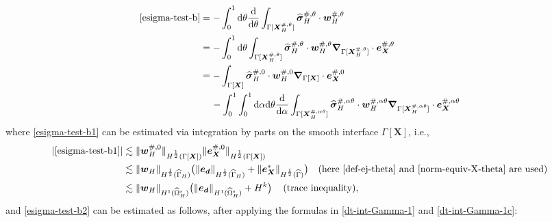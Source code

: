 \documentclass[11pt,reqno]{amsart}
\theoremstyle{definition}
\theoremstyle{plain}
\numberwithin{theorem}{section}
\numberwithin{proposition}{section}
\numberwithin{lemma}{section}
\numberwithin{equation}{section}
\newcommand{\bs}[1]{\boldsymbol{#1}}
\newcommand{\uu}[1]  {{\bs{#1}} }
\newcommand{\grad}   { \uu{\nabla}    }
\def\d{\mathrm{d}}
\newcommand{\bw}{{\bs w}}
\renewcommand{\(}{\bigl(}
\renewcommand{\)}{\bigr)}
\begin{document}
\begin{subequations}\label{esigma-test-b12}
\begin{align}
\eqref{esigma-test-b}
&= - \int_0^1\d\theta\frac{\d}{\d\theta}\int_{\Gamma[\bs X_H^{\#,\theta}]} {\widehat{\bs\sigma}}_H^{\#,\theta}\cdot \bw_H^{\#,\theta} \notag\\ 
&= - \int_0^1\d\theta\int_{\Gamma[\bs X_H^{\#,\theta}]} {\widehat{\bs\sigma}}_H^{\#,\theta}\cdot\bw_H^{\#,\theta}\grad_{\Gamma[\bs X_H^{\#,\theta}]}\cdot{\bs e}_{\bs X}^{\#,\theta} \notag\\
&= - \int_{\Gamma[\bs X]} {\widehat{\bs\sigma}}_H^{\#,0} \cdot {\bs w}_H^{\#,0} \grad_{\Gamma[\bs X]}\cdot{\bs e}_{\bs X}^{\#,0} \label{esigma-test-b1}\\
&\quad\, 
- \int_0^1\int_0^1\d\alpha\d\theta \frac{\d}{\d\alpha} \int_{\Gamma[\bs X_H^{\#,\alpha\theta}]} {\widehat{\bs\sigma}}_H^{\#,\alpha\theta}\cdot {\bs w}_H^{\#,\alpha\theta} \grad_{\Gamma[\bs X_H^{\#,\alpha\theta}]}\cdot{\bs e}_{\bs X}^{\#,\alpha\theta}
\label{esigma-test-b2}
\end{align}
\end{subequations} 
where \eqref{esigma-test-b1} can be estimated via integration by parts on the smooth interface $\Gamma[\bs X]$, i.e.,
\begin{align}
|\eqref{esigma-test-b1}|
&\lesssim \|{\bs w}_H^{\#,0}\|_{H^{\frac12}(\Gamma[\bs X])} 
\| {\bs e}_{\bs X}^{\#,0} \|_{H^{\frac12}(\Gamma[\bs X])} \notag\\
&\lesssim \|{\bs w}_H\|_{H^{\frac12}(\widehat\Gamma_H)} 
\big(\| {\bs e}_{\bs d}\|_{H^{\frac12}(\widehat\Gamma_H)} 
+ \| {\bs e}_{\bs X}^*\|_{H^{\frac12}(\widehat\Gamma)} \big)\quad\mbox{(here \eqref{def-ej-theta} and \eqref{norm-equiv-X-theta} are used)}\notag\\
&\lesssim \|{\bs w}_H\|_{H^1(\widehat\Omega^{\rm s}_H)} 
\big( \| {\bs e}_{\bs d}\|_{H^1(\widehat\Omega^{\rm s}_H)} + H^k \big) \quad\,\mbox{(trace inequality)},
\end{align}
and \eqref{esigma-test-b2} can be estimated as follows, after applying the formulas in \eqref{dt-int-Gamma-1} and \eqref{dt-int-Gamma-1c}:
\end{document}
